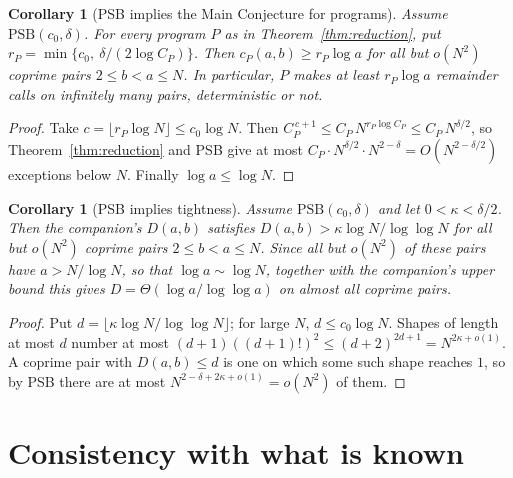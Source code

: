 \documentclass[11pt]{article}
\newtheorem{corollary}[theorem]{Corollary}
\theoremstyle{remark}
\begin{document}
\begin{corollary}[PSB implies the Main Conjecture for programs]\label{cor:main}
Assume $\mathrm{PSB}(c_0,\delta)$. For every program $P$ as in
Theorem~\ref{thm:reduction}, put $r_P=\min\{c_0,\ \delta/(2\log C_P)\}$. Then
$c_P(a,b)\geq r_P\log a$ for all but $o(N^2)$ coprime pairs
$2\leq b<a\leq N$. In particular, $P$ makes at least $r_P\log a$ remainder
calls on infinitely many pairs, deterministic or not.
\end{corollary}

\begin{proof}
Take $c=\lfloor r_P\log N\rfloor\leq c_0\log N$. Then
$C_P^{\,c+1}\leq C_P\,N^{r_P\log C_P}\leq C_P\,N^{\delta/2}$, so
Theorem~\ref{thm:reduction} and PSB give at most
$C_P\cdot N^{\delta/2}\cdot N^{2-\delta}=O(N^{2-\delta/2})$ exceptions below
$N$. Finally $\log a\leq\log N$.
\end{proof}

\begin{corollary}[PSB implies tightness]\label{cor:tight}
Assume $\mathrm{PSB}(c_0,\delta)$ and let $0<\kappa<\delta/2$. Then the
companion's $D(a,b)$ satisfies $D(a,b)>\kappa\log N/\log\log N$ for all but
$o(N^2)$ coprime pairs $2\leq b<a\leq N$. Since all but $o(N^2)$ of these pairs
have $a>N/\log N$, so that $\log a\sim\log N$, together with the companion's
upper bound this gives $D=\Theta(\log a/\log\log a)$ on almost all coprime
pairs.
\end{corollary}

\begin{proof}
Put $d=\lfloor\kappa\log N/\log\log N\rfloor$; for large $N$,
$d\leq c_0\log N$. Shapes of length at most $d$ number at most
$(d+1)((d+1)!)^2\leq(d+2)^{2d+1}=N^{2\kappa+o(1)}$. A coprime pair with
$D(a,b)\leq d$ is one on which some such shape reaches $1$, so by PSB there
are at most $N^{2-\delta+2\kappa+o(1)}=o(N^2)$ of them.
\end{proof}

\section{Consistency with what is known}
\end{document}
